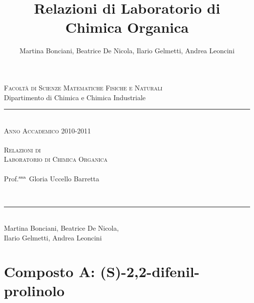 \documentclass[a4paper, italian, oneside, 12pt]{article}
\title{Relazioni di Laboratorio di Chimica Organica \romannumeral 3}
\author{Martina Bonciani, Beatrice De Nicola, Ilario Gelmetti, Andrea Leoncini}
\begin{document}
\setcounter{errorcontextlines}{\maxdimen}

\begin{titlepage}


\begin{center}
   	\large{\textsc{Facoltà di Scienze Matematiche Fisiche e Naturali}}\\
   	\large{{Dipartimento di Chimica e Chimica Industriale}}\\
    
		\rule{5cm}{1pt}\\
	\textsc{Anno Accademico 2010-2011}\\
			\makebox[\textwidth]{\rule{0pt}{.22\textheight}}\\
	\LARGE{\textsc{Relazioni di \\Laboratorio di Chimica Organica }}\\
	\bigskip	
		{\normalsize\makebox[.4\textwidth]{\rule{2cm}{1pt}}\\{Prof.$^{\rm{ssa}}$ Gloria Uccello Barretta}}\\
\end{center}

\vfill
\begin{small}
\makebox[\textwidth]{\rule{0pt}{.02\textheight}}\\
	\begin{center}
	\rule{3cm}{1pt}\\
	\large{Martina Bonciani, Beatrice De Nicola,\\ Ilario Gelmetti, Andrea Leoncini}\\		
	\end{center}
\end{small}


\end{titlepage}
\pagestyle{fancy}
\addtolength{\headwidth}{0.7cm}
\lhead[\fancyplain{}{\textbf{\footnotesize{\leftmark}}}]{}
\chead{}
\rhead[]{\fancyplain{}{\textbf{\footnotesize{\rightmark}}}}
\rfoot[\footnotesize{\slshape \footnotesize{\today}}]{\thepage}

\tableofcontents
\makeatletter
\newcommand\arraybslash{\let\\\@arraycr}
\makeatother
\setlength\tabcolsep{1mm}
\renewcommand\arraystretch{1.3}

\newpage
\section{Composto A: (S)-2,2-difenil-prolinolo}
\end{document}
